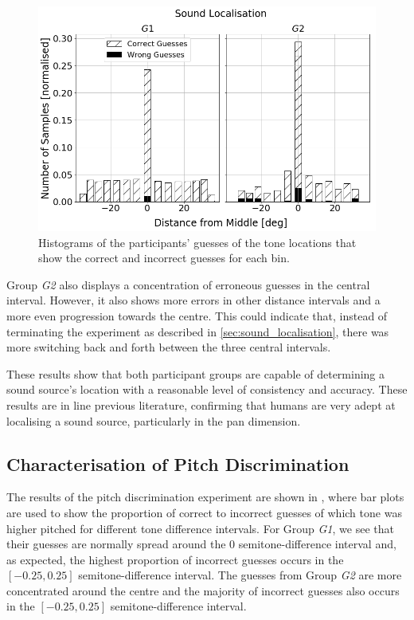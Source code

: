 \documentclass[]{interact}
\begin{document}
\begin{figure}
  \centering
  \includegraphics[width=1.0\textwidth]{figures/sound_localisation.png}
  \caption{Histograms of the participants' guesses of the tone locations that show the correct and incorrect guesses for each bin. }\label{fig:sound-localisation}
\end{figure}

Group \textit{G2} also displays a concentration of erroneous guesses in the central interval.
However, it also shows more errors in other distance intervals and a more even progression towards the centre.
This could indicate that, instead of terminating the experiment as described in \cref{sec:sound_localisation}, there was more switching back and forth between the three central intervals. 

These results show that both participant groups are capable of determining a sound source's location with a reasonable level of consistency and accuracy.
These results are in line previous literature, confirming that humans are very adept at localising a sound source, particularly in the pan dimension. 

\subsection{Characterisation of Pitch Discrimination}

The results of the pitch discrimination experiment are shown in , where bar plots are used to show the proportion of correct to incorrect guesses of which tone was higher pitched for different tone difference intervals. 
For Group \textit{G1}, we see that their guesses are normally spread around the 0 semitone-difference interval and, as expected, the highest proportion of incorrect guesses occurs in the $[-0.25, 0.25]$ semitone-difference interval. 
The guesses from Group \textit{G2} are more concentrated around the centre and the majority of incorrect guesses also occurs in the $[-0.25, 0.25]$ semitone-difference interval.
\end{document}
